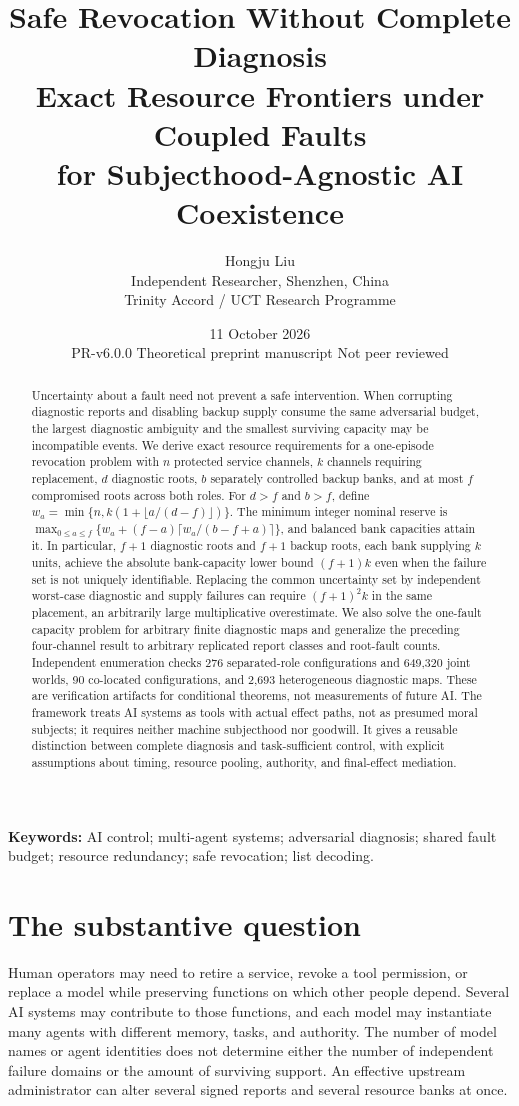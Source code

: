 \documentclass[11pt,a4paper]{article}
\title{\vspace{-1cm}\textbf{Safe Revocation Without Complete Diagnosis}\\[6pt]
\Large Exact Resource Frontiers under Coupled Faults\\for Subjecthood-Agnostic AI Coexistence}
\author{Hongju Liu\\\normalsize Independent Researcher, Shenzhen, China\\\normalsize Trinity Accord / UCT Research Programme}
\date{11 October 2026\\\small PR-v6.0.0\;\textbullet\; Theoretical preprint manuscript\;\textbullet\; Not peer reviewed}
\theoremstyle{definition}\newtheorem{definition}{Definition}
\begin{document}
\maketitle\thispagestyle{plain}
\begin{abstract}
Uncertainty about a fault need not prevent a safe intervention. When corrupting diagnostic reports and disabling backup supply consume the same adversarial budget, the largest diagnostic ambiguity and the smallest surviving capacity may be incompatible events. We derive exact resource requirements for a one-episode revocation problem with $n$ protected service channels, $k$ channels requiring replacement, $d$ diagnostic roots, $b$ separately controlled backup banks, and at most $f$ compromised roots across both roles. For $d>f$ and $b>f$, define $w_a=\min\{n,k(1+\lfloor a/(d-f)\rfloor)\}$. The minimum integer nominal reserve is
$\max_{0\le a\le f}\{w_a+(f-a)\lceil w_a/(b-f+a)\rceil\}$,
and balanced bank capacities attain it. In particular, $f+1$ diagnostic roots and $f+1$ backup roots, each bank supplying $k$ units, achieve the absolute bank-capacity lower bound $(f+1)k$ even when the failure set is not uniquely identifiable. Replacing the common uncertainty set by independent worst-case diagnostic and supply failures can require $(f+1)^2k$ in the same placement, an arbitrarily large multiplicative overestimate. We also solve the one-fault capacity problem for arbitrary finite diagnostic maps and generalize the preceding four-channel result to arbitrary replicated report classes and root-fault counts. Independent enumeration checks 276 separated-role configurations and 649,320 joint worlds, 90 co-located configurations, and 2,693 heterogeneous diagnostic maps. These are verification artifacts for conditional theorems, not measurements of future AI. The framework treats AI systems as tools with actual effect paths, not as presumed moral subjects; it requires neither machine subjecthood nor goodwill. It gives a reusable distinction between complete diagnosis and task-sufficient control, with explicit assumptions about timing, resource pooling, authority, and final-effect mediation.
\end{abstract}
\noindent\textbf{Keywords:} AI control; multi-agent systems; adversarial diagnosis; shared fault budget; resource redundancy; safe revocation; list decoding.

\section{The substantive question}
Human operators may need to retire a service, revoke a tool permission, or replace a model while preserving functions on which other people depend. Several AI systems may contribute to those functions, and each model may instantiate many agents with different memory, tasks, and authority. The number of model names or agent identities does not determine either the number of independent failure domains or the amount of surviving support. An effective upstream administrator can alter several signed reports and several resource banks at once.
\end{document}
